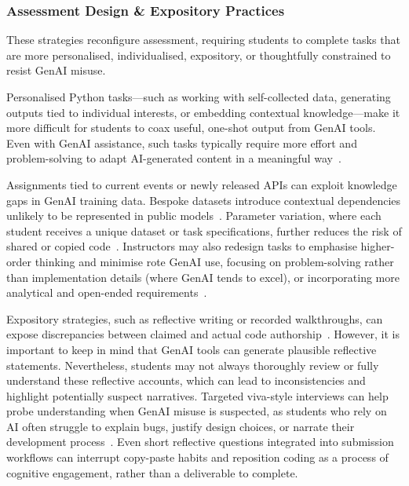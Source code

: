 \subsubsection{Assessment Design \& Expository Practices}
\label{sec:assessment-design-&-expository-practices}

These strategies reconfigure assessment, requiring students to complete tasks that are more personalised, individualised, expository, or thoughtfully constrained to resist GenAI misuse.

Personalised Python tasks---such as working with self-collected data, generating outputs tied to individual interests, or embedding contextual knowledge---make it more difficult for students to coax useful, one-shot output from GenAI tools. Even with GenAI assistance, such tasks typically require more effort and problem-solving to adapt AI-generated content in a meaningful way~\cite{xie_ai_2023}. 

Assignments tied to current events or newly released APIs can exploit knowledge gaps in GenAI training data. Bespoke datasets introduce contextual dependencies unlikely to be represented in public models~\cite{rahe_how_2025}. Parameter variation, where each student receives a unique dataset or task specifications, further reduces the risk of shared or copied code~\cite{deitrick_individualizing_2022}. Instructors may also redesign tasks to emphasise higher-order thinking and minimise rote GenAI use, focusing on problem-solving rather than implementation details (where GenAI tends to excel), or incorporating more analytical and open-ended requirements~\cite{zastudil_generative_2023}.

Expository strategies, such as reflective writing or recorded walkthroughs, can expose discrepancies between claimed and actual code authorship~\cite{mahon_guidelines_2024}. However, it is important to keep in mind that GenAI tools can generate plausible reflective statements. Nevertheless, students may not always thoroughly review or fully understand these reflective accounts, which can lead to inconsistencies and highlight potentially suspect narratives. Targeted viva-style interviews can help probe understanding when GenAI misuse is suspected, as students who rely on AI often struggle to explain bugs, justify design choices, or narrate their development process~\cite{moorhouse_generative_2023}. Even short reflective questions integrated into submission workflows can interrupt copy-paste habits and reposition coding as a process of cognitive engagement, rather than a deliverable to complete.

